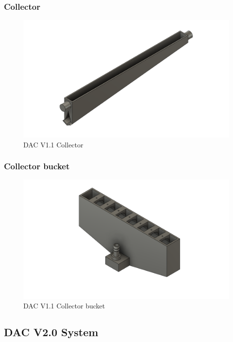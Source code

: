 \begin{appendices}
\subsubsection{Collector}

\begin{figure}[H]
    \centering
    \includegraphics[scale = 0.4]{images/mywork/Sprint4/Collector_old.png}
    \caption{DAC V1.1 Collector}
    \label{fig:dacv1.1coll}
\end{figure}

\subsubsection{Collector bucket}

\begin{figure}[H]
    \centering
    \includegraphics[scale = 0.4]{images/mywork/Sprint4/DACcollbuc_old.png}
    \caption{DAC V1.1 Collector bucket}
    \label{fig:dacv1.1collbuc}
\end{figure}



\subsection{DAC V2.0 System}


\end{appendices}

